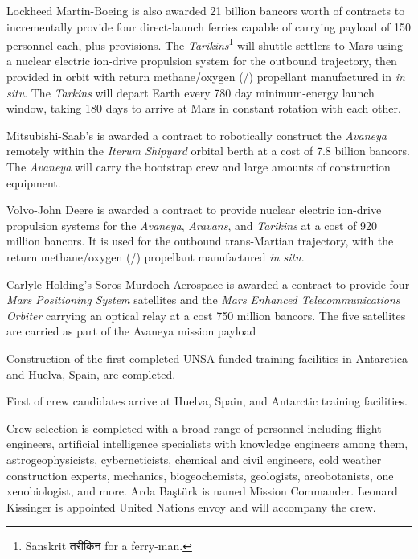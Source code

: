Lockheed Martin-Boeing is also awarded 21 billion bancors worth of contracts to incrementally provide four direct-launch ferries capable of carrying payload of 150 personnel each, plus provisions. The {\it Tarikins}\footnote{Sanskrit तरीकिन for a ferry-man.} will shuttle settlers to Mars using a nuclear electric ion-drive propulsion system for the outbound trajectory, then provided in orbit with return methane/oxygen (/) propellant manufactured in {\it in situ}. The {\it Tarkins} will depart Earth every 780 day minimum-energy launch window, taking 180 days to arrive at Mars in constant rotation with each other.

Mitsubishi-Saab's is awarded a contract to robotically construct the {\it Avaneya} remotely within the {\it Iterum Shipyard} orbital berth at a cost of 7.8 billion bancors. The {\it Avaneya} will carry the bootstrap crew and large amounts of construction equipment.

Volvo-John Deere is awarded a contract to provide nuclear electric ion-drive propulsion systems for the {\it Avaneya}, {\it Aravans}, and {\it Tarikins} at a cost of 920 million bancors. It is used for the outbound trans-Martian trajectory, with the return methane/oxygen (/) propellant manufactured {\it in situ}.

Carlyle Holding's Soros-Murdoch Aerospace is awarded a contract to provide four {\it Mars Positioning System} satellites and the {\it Mars Enhanced Telecommunications Orbiter} carrying an optical relay at a cost 750 million bancors. The five satellites are carried as part of the Avaneya mission payload
\StopTimelineDate

Construction of the first completed UNSA funded training facilities in Antarctica and Huelva, Spain, are completed.
\StopTimelineDate

First of crew candidates arrive at Huelva, Spain, and Antarctic training facilities.
\StopTimelineDate

Crew selection is completed with a broad range of personnel including flight engineers, artificial intelligence specialists with knowledge engineers among them, astrogeophysicists, cyberneticists, chemical and civil engineers, cold weather construction experts, mechanics, biogeochemists, geologists, areobotanists, one xenobiologist, and more. Arda Baştürk is named Mission Commander. Leonard Kissinger is appointed United Nations envoy and will accompany the crew.
\StopTimelineDate

